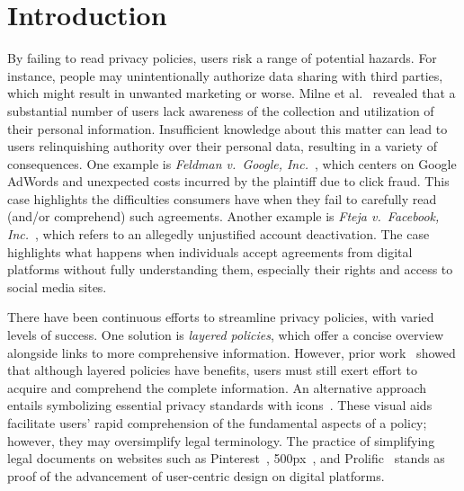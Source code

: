 \section{Introduction
}\label{secIntroduction}


By failing to read privacy policies, users risk a range of potential hazards.
For instance, people may unintentionally authorize data sharing with third parties, which might result in unwanted marketing or worse.
Milne et al.~\cite{milne2004consumers} revealed that a substantial number of users lack awareness of the collection and utilization of their personal information.
Insufficient knowledge about this matter can lead to users relinquishing authority over their personal data, resulting in a variety of consequences.
One example is \textit{Feldman v.\ Google, Inc.}~\cite{2007feldman}, which centers on Google AdWords and unexpected costs incurred by the plaintiff due to click fraud.
This case highlights the difficulties consumers have when they fail to carefully read (and/or comprehend) such agreements.
Another example is \textit{Fteja v.\ Facebook, Inc.}~\cite{2012fteja}, which refers to an allegedly unjustified account deactivation.
The case highlights what happens when individuals accept agreements from digital platforms without fully understanding them, especially their rights and access to social media sites.


There have been continuous efforts to streamline privacy policies, with varied levels of success.
One solution is \textit{layered policies}, which offer a concise overview alongside links to more comprehensive information.
However, prior work~\cite{mcdonald2009comparative} showed that although layered policies have benefits, users must still exert effort to acquire and comprehend the complete information.
An alternative approach entails symbolizing essential privacy standards with icons~\cite{kelley2010standardizing}.
These visual aids facilitate users' rapid comprehension of the fundamental aspects of a policy; however, they may oversimplify legal terminology.
The practice of simplifying legal documents on websites such as Pinterest~\cite{pinterest},
500px~\cite{500px}, and 
Prolific~\cite{prolific}
stands as proof of the advancement of user-centric design on digital platforms.


